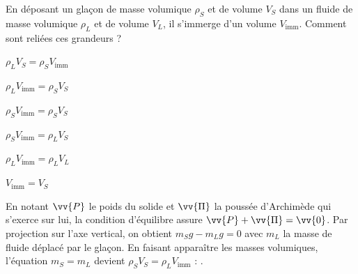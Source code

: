 \begin{enonce}
En déposant un glaçon de masse volumique $\rho_S$ et de volume $V_S$ dans un fluide de masse volumique $\rho_L$ et de volume $V_L$, il s'immerge d'un volume $V_\mathrm{imm}$. Comment sont reliées ces grandeurs ?
	
	\begin{listeQCM2Colonnes}
	\item $\rho_L V_S=\rho_S V_\mathrm{imm}$
	\item $\rho_L V_\mathrm{imm}=\rho_S V_S$
	\item $\rho_S V_\mathrm{imm}=\rho_S V_S$
	\item $\rho_S V_\mathrm{imm}=\rho_L V_S$
	\item $\rho_L V_\mathrm{imm}=\rho_L V_L$
	\item $V_\mathrm{imm}=V_S$
	\end{listeQCM2Colonnes}

\end{enonce}

\reponse{\reponseB{}}

\begin{corrige}
	En notant $\vv{P}$ le poids du solide et $\vv{\Pi}$ la poussée d'Archimède qui s'exerce sur lui, la condition d'équilibre assure $\vv{P}+\vv{\Pi}=\vv{0}$. Par projection sur l'axe vertical, on obtient $m_S g - m_L g=0$ avec $m_L$ la masse de fluide déplacé par le glaçon. En faisant apparaître les masses volumiques, l'équation $m_S = m_L$ devient $\rho_S V_S = \rho_L V_\mathrm{imm}$ : \reponseB.
\end{corrige}


\finEntrainement





\hauteurLargeurCadreReponse		{7mm}{3cm}
\typeEntrainement				{} %
\initialisationEntrainement

